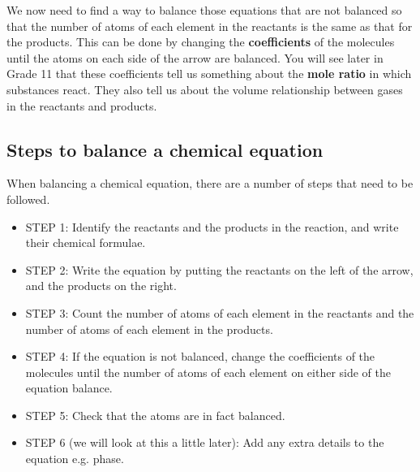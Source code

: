 We now need to find a way to balance those equations that are not balanced so that the number of atoms of each element in the reactants is the same as that for the products. This can be done by changing the \textbf{coefficients} of the molecules until the atoms on each side of the arrow are balanced. You will see later in Grade 11 that these coefficients tell us something about the \textbf{mole ratio} in which substances react. They also tell us about the volume relationship between gases in the reactants and products.


\subsection{Steps to balance a chemical equation}

When balancing a chemical equation, there are a number of steps that need to be followed. 

\begin{itemize}
\item{STEP 1: Identify the reactants and the products in the reaction, and write their chemical formulae.}
\item{STEP 2: Write the equation by putting the reactants on the left of the arrow, and the products on the right.}
\item{STEP 3: Count the number of atoms of each element in the reactants and the number of atoms of each element in the products.}
\item{STEP 4: If the equation is not balanced, change the coefficients of the molecules until the number of atoms of each element on either side of the equation balance.}
\item{STEP 5: Check that the atoms are in fact balanced.}
\item{STEP 6 (we will look at this a little later): Add any extra details to the equation e.g. phase.}
\end{itemize}

